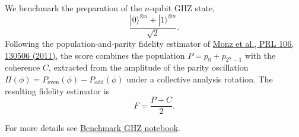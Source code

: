 We benchmark the preparation of the \(n\)-qubit GHZ state,
\[
\frac{|0\rangle^{\otimes n} + |1\rangle^{\otimes n}}{\sqrt{2}}.
\]
Following the population-and-parity fidelity estimator of \href{https://link.aps.org/doi/10.1103/PhysRevLett.106.130506}{Monz et al., PRL 106, 130506 (2011)}, the score combines the population \(P = p_0 + p_{2^n-1}\) with the coherence \(C\), extracted from the amplitude of the parity oscillation \(\Pi(\phi) = P_{\mathrm{even}}(\phi) - P_{\mathrm{odd}}(\phi)\) under a collective analysis rotation. The resulting fidelity estimator is
\[
F = \frac{P + C}{2}.
\]
\smallskip

For more details see \href{https://github.com/softqlib/softqlib-quantum-algorithms/tree/main/benchmarking/benchmarks/benchmark\_ghz.ipynb}{Benchmark GHZ notebook}.
\medskip
